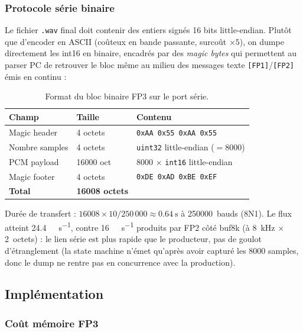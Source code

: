 \subsubsection{Protocole série binaire}

Le fichier \texttt{.wav} final doit contenir des entiers signés 16 bits little-endian. Plutôt que d'encoder en ASCII (coûteux en bande passante, surcoût $\times 5$), on dumpe directement les int16 en binaire, encadrés par des \emph{magic bytes} qui permettent au parser PC de retrouver le bloc même au milieu des messages texte \texttt{[FP1]}/\texttt{[FP2]} émis en continu :

\begin{table}[H]
\centering
\small
\begin{tabularx}{\linewidth}{@{}l l X@{}}
\toprule
\textbf{Champ} & \textbf{Taille} & \textbf{Contenu} \\
\midrule
Magic header    & 4 octets  & \texttt{0xAA 0x55 0xAA 0x55} \\
Nombre samples  & 4 octets  & \texttt{uint32} little-endian ($= \num{8000}$) \\
PCM payload     & \num{16000} oct & \num{8000} $\times$ \texttt{int16} little-endian \\
Magic footer    & 4 octets  & \texttt{0xDE 0xAD 0xBE 0xEF} \\
\midrule
\textbf{Total}  & \textbf{\num{16008} octets} & \\
\bottomrule
\end{tabularx}
\caption{Format du bloc binaire FP3 sur le port série.}
\label{tab:fp3-protocol}
\end{table}

Durée de transfert : $\num{16008} \times 10 / 250\,000 \approx \SI{0.64}{\second}$ à \num{250000}~bauds (8N1). Le flux atteint \SI{24.4}{\kibi\byte\per\second}, contre \SI{16}{\kibi\byte\per\second} produits par FP2 côté buf8k (à \SI{8}{\kilo\hertz} $\times$ 2~octets) : le lien série est plus rapide que le producteur, pas de goulot d'étranglement (la state machine n'émet qu'après avoir capturé les \num{8000} samples, donc le dump ne rentre pas en concurrence avec la production).

\subsection{Implémentation}

\subsubsection{Coût mémoire FP3}

